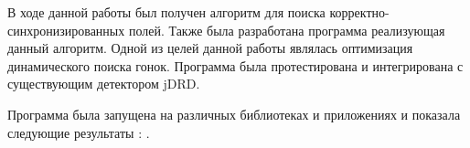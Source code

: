 \startconclusionpage

В ходе данной работы был получен алгоритм для поиска корректно-синхронизированных полей.
Также была разработана программа реализующая данный алгоритм. 
Одной из целей данной работы являлась оптимизация динамического поиска гонок.
Программа была протестирована и интегрирована с существующим детектором jDRD.

Программа была запущена на различных библиотеках и приложениях и показала следующие результаты  : .

\FloatBarrier
